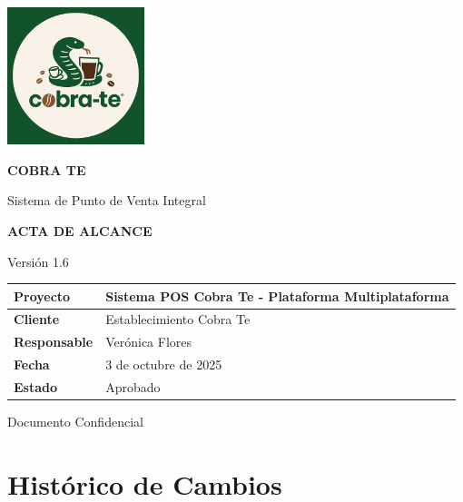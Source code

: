 \documentclass[12pt,letterpaper]{article}
\begin{document}
\begin{titlepage}
    \centering
    \vspace*{1cm}
    
    \includegraphics[width=4cm]{Logo.png}
    
    \vspace{1cm}
    {\color{cobrablue}\Huge\textbf{COBRA TE}}
    
    \vspace{0.5cm}
    {\color{cobraorange}\Large Sistema de Punto de Venta Integral}
    
    \vspace{2cm}
    {\color{cobragray}\LARGE\textbf{ACTA DE ALCANCE}}
    
    \vspace{1cm}
    {\color{cobragray}\large Versión 1.6}
    
    \vspace{2cm}
    \begin{tabular}{|p{4cm}|p{8cm}|}
        \hline
        \rowcolor{cobrablue!20}
        \textbf{Proyecto} & Sistema POS Cobra Te - Plataforma Multiplataforma \\
        \hline
        \textbf{Cliente} & Establecimiento Cobra Te \\
        \hline
        \textbf{Responsable} & Verónica Flores \\
        \hline
        \textbf{Fecha} & 3 de octubre de 2025 \\
        \hline
        \textbf{Estado} & Aprobado \\
        \hline
    \end{tabular}
    
    \vfill
    {\color{cobragray}\large Documento Confidencial}
    
\end{titlepage}

\newpage

\tableofcontents
\newpage

\section*{Histórico de Cambios}
\end{document}
